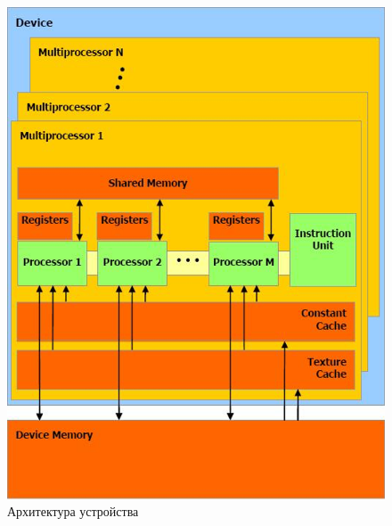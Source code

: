 \documentclass[a4paper, final]{article}
\begin{document}
    \begin{figure}[h!]
    	\centering\includegraphics[scale=0.75]{logik.png}
         \caption{Архитектура устройства}	
     \label{device}
    \end{figure}

    \clearpage
\end{document}
